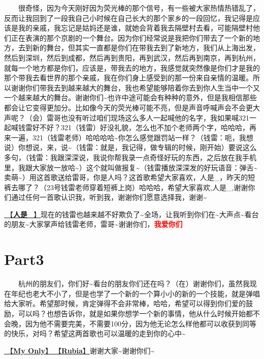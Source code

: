 \documentclass[]{ctexbook}
\begin{document}
  很奇怪，因为今天刚好因为荧光棒的那个信号，有一些被大家热情热错乱了，反而让我回到了一段我自己小时候在自己长大的那个家乡的一段回忆，我记得是应该是我的亲戚，我忘记是姑妈还是谁，就她会背着我去隔壁村去看，可能隔壁村他们正在表演的那个京剧的一个舞台。因为你们经常说是我把你们带去了一个新的地方，去到新的舞台，但其实一直都是你们在带我去到了新地方，我们从上海出发，然后到深圳，然后到成都，然后再到贵阳，再到武汉，然后再到南京，再到杭州，就每一个地方都是你们，应该是，带我去的地方，我感觉就突然像是你们才是我的那个带我去看世界的那个亲戚，我在你们身上感受到的那一份来自亲情的温暖。所以谢谢你们带我去到越来越大的舞台，我也希望能够陪着你去到你人生当中一个又一个越来越大的舞台。谢谢你们\textasciitilde 也许中途可能会有种种的意外，但是我相信那些都会让它变得更加分。比如像今天的荧光棒可能不亮，但是声音呼喊声会不会更大声呢？（会）雷哥也没有听过咱们现场这么多人一起喊他的名字，我如果喊321一起喊钱雷好不好？321（钱雷）好没礼貌，怎么也不加个老师两个字，哈哈哈，再来一遍，321（钱雷老师）哈哈哈哈\textasciitilde 你怎么感觉跟罚站一样？（钱雷：呃，我想说）你想说，来，说\textasciitilde（钱雷：就是，我记得，做专辑的时候，刚开始）要说这么多句，（钱雷：我跟深深说，我说你帮我录一点奇怪好玩的东西，之后放在我手机里，我跟大家放一放哈\textasciitilde）这个就叫做报复\textasciitilde（钱雷播放深深发的好玩语音：弹舌\textasciitilde 卖萌\textasciitilde）用这首歌送给雷哥，你是人吗？这首歌希望大家喜欢，人是\_，昨天的短裤去哪了？（23号钱雷老师穿着短裤上岗）哈哈哈，希望大家喜欢,人是\_,谢谢你们通过任何一首歌认识我，听到我，谢谢你们愿意选择我，谢谢\textasciitilde{}

\hyperref[renshi]{🎵【\textbf{人是\_}】}现在的钱雷也越来越不好欺负了\textasciitilde 全场，让我听到你们在\textasciitilde 大声点\textasciitilde 看台的朋友\textasciitilde 大家掌声给钱雷老师，雷哥\textasciitilde 谢谢你们，\textbf{\textcolor{red}{我爱你们~} }

\section{Part3}\label{hangzhou-20240824-part3}

  杭州的朋友们，你们好\textasciitilde 看台的朋友你们还在吗？（在）谢谢你们，虽然我现在年纪也老大不小了，但是也学了一个新的一个算小小的新的一个技能，就是弹唱给大家听。希望那时候，肯定弹得不会非常棒，哈哈，希望可以得到你们爱的鼓励，可以吗？也想告诉你，就是如果你想学一个新的事情，他从什么时候开始都不会晚，因为他不需要完美，不需要100分，因为他无论怎么样他都可以收获到同等的快乐，对吗？希望这两首歌也可以温暖的走到你的心中\textasciitilde{}

\hyperref[my-only]{🎵【\textbf{My Only}】}\hyperref[rubia]{🎵【\textbf{Rubia}】}谢谢大家\textasciitilde 谢谢你们\textasciitilde{}
\end{document}
